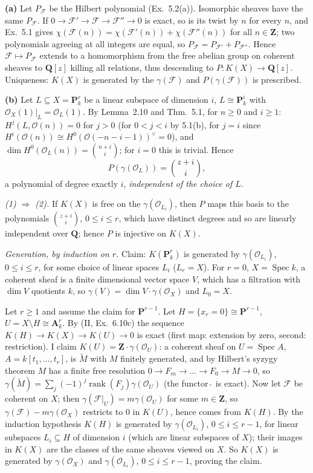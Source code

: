 \documentclass[11pt]{article}
\begin{document}
\textbf{(a)} Let $P_{\mathcal F}$ be the Hilbert polynomial (Ex.~5.2(a)). Isomorphic sheaves have the same $P_{\mathcal F}$. If $0\to\mathcal F'\to\mathcal F\to\mathcal F''\to0$ is exact, so is its twist by $n$ for every $n$, and Ex.~5.1 gives $\chi(\mathcal F(n))=\chi(\mathcal F'(n))+\chi(\mathcal F''(n))$ for all $n\in\mathbf Z$; two polynomials agreeing at all integers are equal, so $P_{\mathcal F}=P_{\mathcal F'}+P_{\mathcal F''}$. Hence $\mathcal F\mapsto P_{\mathcal F}$ extends to a homomorphism from the free abelian group on coherent sheaves to $\mathbf Q[z]$ killing all relations, thus descending to $P\colon K(X)\to\mathbf Q[z]$. Uniqueness: $K(X)$ is generated by the $\gamma(\mathcal F)$ and $P(\gamma(\mathcal F))$ is prescribed.

\textbf{(b)} Let $L\subseteq X=\mathbf P^r_k$ be a linear subspace of dimension $i$, $L\cong\mathbf P^i_k$ with $\mathcal O_X(1)|_L=\mathcal O_L(1)$. By Lemma~2.10 and Thm.~5.1, for $n\ge0$ and $i\ge1$: $H^j(L,\mathcal O(n))=0$ for $j>0$ (for $0<j<i$ by 5.1(b), for $j=i$ since $H^i(\mathcal O(n))\cong H^0(\mathcal O(-n-i-1))^\vee=0$), and $\dim H^0(\mathcal O_L(n))=\binom{n+i}{i}$; for $i=0$ this is trivial. Hence
\[
P(\gamma(\mathcal O_L))=\binom{z+i}{i},
\]
a polynomial of degree exactly $i$, \emph{independent of the choice of $L$}.

\emph{(1) $\Rightarrow$ (2).} If $K(X)$ is free on the $\gamma(\mathcal O_{L_i})$, then $P$ maps this basis to the polynomials $\binom{z+i}i$, $0\le i\le r$, which have distinct degrees and so are linearly independent over $\mathbf Q$; hence $P$ is injective on $K(X)$.

\emph{Generation, by induction on $r$.} Claim: $K(\mathbf P^r_k)$ is generated by $\gamma(\mathcal O_{L_i})$, $0\le i\le r$, for some choice of linear spaces $L_i$ ($L_r=X$). For $r=0$, $X=\operatorname{Spec}k$, a coherent sheaf is a finite dimensional vector space $V$, which has a filtration with $\dim V$ quotients $k$, so $\gamma(V)=\dim V\cdot\gamma(\mathcal O_X)$ and $L_0=X$.

Let $r\ge1$ and assume the claim for $\mathbf P^{r-1}$. Let $H=\{x_r=0\}\cong\mathbf P^{r-1}$, $U=X\setminus H\cong\mathbf A^r_k$. By (II, Ex.~6.10c) the sequence $K(H)\to K(X)\to K(U)\to0$ is exact (first map: extension by zero, second: restriction). I claim $K(U)=\mathbf Z\cdot\gamma(\mathcal O_U)$: a coherent sheaf on $U=\operatorname{Spec}A$, $A=k[t_1,\dots,t_r]$, is $\tilde M$ with $M$ finitely generated, and by Hilbert's syzygy theorem $M$ has a finite free resolution $0\to F_m\to\dots\to F_0\to M\to0$, so $\gamma(\tilde M)=\sum_j(-1)^j\operatorname{rank}(F_j)\gamma(\mathcal O_U)$ (the functor $\tilde{\ }$ is exact). Now let $\mathcal F$ be coherent on $X$; then $\gamma(\mathcal F|_U)=m\gamma(\mathcal O_U)$ for some $m\in\mathbf Z$, so $\gamma(\mathcal F)-m\gamma(\mathcal O_X)$ restricts to $0$ in $K(U)$, hence comes from $K(H)$. By the induction hypothesis $K(H)$ is generated by $\gamma(\mathcal O_{L_i})$, $0\le i\le r-1$, for linear subspaces $L_i\subseteq H$ of dimension $i$ (which are linear subspaces of $X$); their images in $K(X)$ are the classes of the same sheaves viewed on $X$. So $K(X)$ is generated by $\gamma(\mathcal O_X)$ and $\gamma(\mathcal O_{L_i})$, $0\le i\le r-1$, proving the claim.
\end{document}
